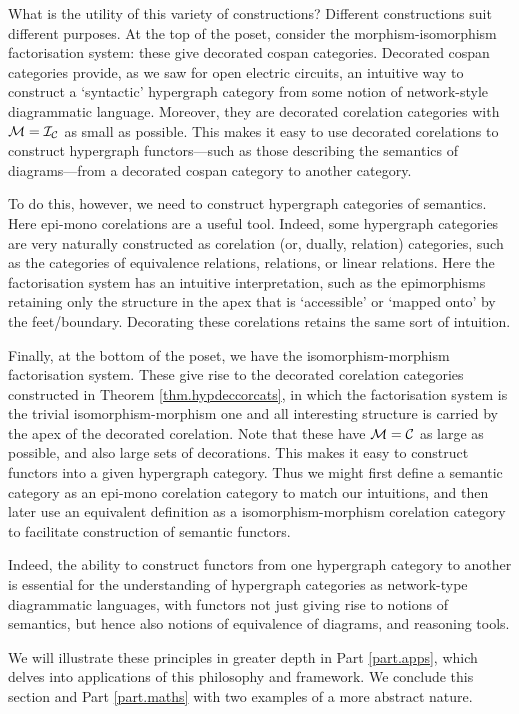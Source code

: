 What is the utility of this variety of constructions? Different constructions
suit different purposes. At the top of the poset, consider the
morphism-isomorphism factorisation system: these give decorated cospan
categories. Decorated cospan categories provide, as we saw for open electric
circuits, an intuitive way to construct a `syntactic' hypergraph category from
some notion of network-style diagrammatic language. Moreover, they are decorated
corelation categories with $\mathcal M = \mathcal I_{\mathcal C}$ as small as possible. This
makes it easy to use decorated corelations to construct hypergraph
functors---such as those describing the semantics of diagrams---from a decorated
cospan category to another category.

To do this, however, we need to construct hypergraph categories of semantics.
Here epi-mono corelations are a useful tool. Indeed, some hypergraph categories
are very naturally constructed as corelation (or, dually, relation) categories,
such as the categories of equivalence relations, relations, or linear relations.
Here the factorisation system has an intuitive interpretation, such as the
epimorphisms retaining only the structure in the apex that is `accessible' or
`mapped onto' by the feet/boundary. Decorating these corelations retains the
same sort of intuition. 

Finally, at the bottom of the poset, we have the isomorphism-morphism
factorisation system. These give rise to the decorated corelation categories
constructed in Theorem \ref{thm.hypdeccorcats}, in which the factorisation
system is the trivial isomorphism-morphism one and all interesting structure is
carried by the apex of the decorated corelation. Note that these have $\mathcal M =
\mathcal C$ as large as possible, and also large sets of decorations. This makes it
easy to construct functors into a given hypergraph category. Thus we might first
define a semantic category as an epi-mono corelation category to match our
intuitions, and then later use an equivalent definition as a
isomorphism-morphism corelation category to facilitate construction of semantic
functors.

Indeed, the ability to construct functors from one hypergraph category to
another is essential for the understanding of hypergraph categories as
network-type diagrammatic languages, with functors not just giving rise to
notions of semantics, but hence also notions of equivalence of diagrams, and
reasoning tools.

We will illustrate these principles in greater depth in Part \ref{part.apps},
which delves into applications of this philosophy and framework. We conclude
this section and Part \ref{part.maths} with two examples of a more abstract
nature.

